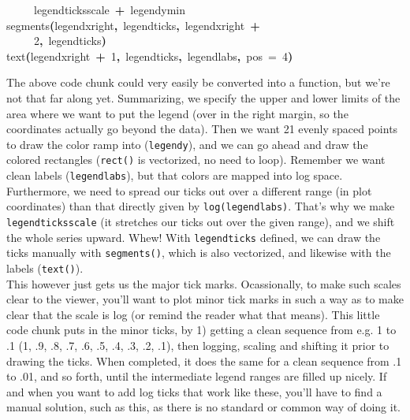 \documentclass[a4paper]{article}
\newcommand{\hlnumber}[1]{\textcolor[rgb]{0.0823529411764706,0.0784313725490196,0.709803921568627}{#1}}%
\newcommand{\hlfunctioncall}[1]{\textcolor[rgb]{1,0,0}{#1}}%
\newcommand{\hlkeyword}[1]{\textcolor[rgb]{0,0,0}{\textbf{#1}}}%
\newcommand{\hlargument}[1]{\textcolor[rgb]{0.694117647058824,0.247058823529412,0.0196078431372549}{#1}}%
\newcommand{\hlsymbol}[1]{\textcolor[rgb]{0,0,0}{#1}}%
\newcommand{\hlprompt}[1]{\textcolor[rgb]{0,0,0}{#1}}%
\newcommand{\hlstd}[1]{\textcolor[rgb]{0,0,0}{#1}}%
\newenvironment{Houtput}{\raggedright}{%
%
}
\begin{document}
\begin{Houtput}
\hlstd{}\hlprompt{{\ }}{\ }{\ }{\ }{\ }\hlsymbol{legendticksscale}{\ }\hlkeyword{+}{\ }\hlsymbol{legendymin}\mbox{}
\normalfont
\hspace*{\fill}\\
\hlstd{}\ttfamily\noindent
\hlprompt{\usebox{\hlnormalsizeboxgreaterthan}{\ }}\hlfunctioncall{segments}\hlkeyword{(}\hlsymbol{legendxright}\hlkeyword{,}{\ }\hlsymbol{legendticks}\hlkeyword{,}{\ }\hlsymbol{legendxright}{\ }\hlkeyword{+}\hspace*{\fill}\\
\hlstd{}\hlprompt{{\ }}{\ }{\ }{\ }{\ }\hlnumber{2}\hlkeyword{,}{\ }\hlsymbol{legendticks}\hlkeyword{)}\mbox{}
\normalfont
\hspace*{\fill}\\
\hlstd{}\ttfamily\noindent
\hlprompt{\usebox{\hlnormalsizeboxgreaterthan}{\ }}\hlfunctioncall{text}\hlkeyword{(}\hlsymbol{legendxright}{\ }\hlkeyword{+}{\ }\hlnumber{1}\hlkeyword{,}{\ }\hlsymbol{legendticks}\hlkeyword{,}{\ }\hlsymbol{legendlabs}\hlkeyword{,}{\ }\hlargument{pos}{\ }\hlargument{=}{\ }\hlnumber{4}\hlkeyword{)}\mbox{}
\normalfont
\hspace*{\fill}\\
\hlstd{}
\end{Houtput}

The above code chunk could very easily be converted into a function, but we're not that far along yet. Summarizing, we specify the upper and lower limits of the area where we want to put the legend (over in the right margin, so the coordinates actually go beyond the data). Then we want 21 evenly spaced points to draw the color ramp into (\texttt{legendy}), and we can go ahead and draw the colored rectangles (\texttt{rect()} is vectorized, no need to loop). Remember we want clean labels (\texttt{legendlabs}), but that colors are mapped into log space. Furthermore, we need to spread our ticks out over a different range (in plot coordinates) than that directly given by \texttt{log(legendlabs)}. That's why we make \texttt{legendticksscale} (it stretches our ticks out over the given range), and we shift the whole series upward. Whew! With \texttt{legendticks} defined, we can draw the ticks manually with \texttt{segments()}, which is also vectorized, and likewise with the labels (\texttt{text()}).\\

This however just gets us the major tick marks. Ocassionally, to make such scales clear to the viewer, you'll want to plot minor tick marks in such a way as to make clear that the scale is log (or remind the reader what that means). This little code chunk puts in the minor ticks, by 1) getting a clean sequence from e.g. 1 to .1 (1, .9, .8, .7, .6, .5, .4, .3, .2, .1), then logging, scaling and shifting it prior to drawing the ticks. When completed, it does the same for a clean sequence from .1 to .01, and so forth, until the intermediate legend ranges are filled up nicely. If and when you want to add log ticks that work like these, you'll have to find a manual solution, such as this, as there is no standard or common way of doing it.
\end{document}
